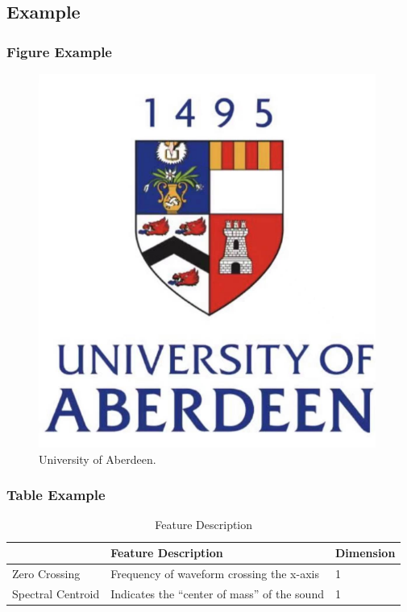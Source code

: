 \documentclass[UTF8,AutoFakeBold=1,AutoFakeSlant,zihao=-4]{SCNU}
\begin{document}
\subsection{Example}

\subsubsection{Figure Example}
\begin{figure}[ht]
    \centering
    \includegraphics[scale=0.3]{figures/abd.png}
    \caption{University of Aberdeen.}
    \label{fig:example}
\end{figure}

\subsubsection{Table Example}
\begin{table}[ht]
    \centering
    \caption{ Feature Description}
    \begin{tabular}{lll}
    \toprule
                     & Feature Description & Dimension \\ \midrule
    Zero Crossing  & Frequency of waveform crossing the x-axis  & 1 \\
    Spectral Centroid & Indicates the “center of mass” of the sound & 1 \\ \bottomrule
    \end{tabular}
    \label{tab:example}
\end{table}
\end{document}
